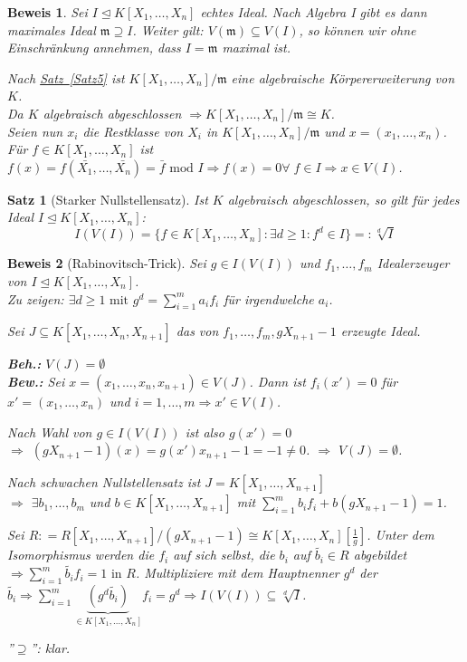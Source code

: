 \documentclass[a4paper,12pt]{scrbook}
\theoremstyle{break}
\theoremstyle{nonumberbreak}
\newtheorem{Bew}{Beweis}
\newtheorem{nnSatz}{Satz}
\theoremstyle{nonumberplain}
\newcommand{\defeqr}[0]{\mathrel{\mathop:}=}
\newcommand{\defeql}[0]{=\mathrel{\mathop:}}
\newcommand{\myref}[2]{%
\hyperref[#2]{#1~\ref*{#2}}%
}
\begin{document}
\begin{Bew}
  Sei $I \trianglelefteq K[X_1, \dots, X_n]$ echtes Ideal. Nach Algebra I gibt es dann maximales Ideal $\mathfrak{m} \supseteq I$. Weiter gilt: $V(\mathfrak{m}) \subseteq V(I)$, so können wir ohne Einschränkung annehmen, dass $I = \mathfrak{m}$ maximal ist.

  Nach \myref{Satz}{Satz5} ist $K[X_1, \dots, X_n]/\mathfrak{m}$ eine algebraische Körpererweiterung von $K$.\\
  Da $K$ algebraisch abgeschlossen $\Rightarrow K[X_1, \dots, X_n]/\mathfrak{m} \cong K$.\\
  Seien nun $x_i$ die Restklasse von $X_i$ in $K[X_1, \dots, X_n]/\mathfrak{m}$ und $x = (x_1, \dots, x_n)$.\\
  Für $f \in K[X_1, \dots, X_n]$ ist $f(x) = f(\bar{X_1}, \dots, \bar{X_n}) = \bar{f} \text{ mod } I \Rightarrow f(x) = 0 \forall \; f \in I \Rightarrow x \in V(I)$.
\end{Bew}

\begin{nnSatz}[Starker Nullstellensatz]
  Ist $K$ algebraisch abgeschlossen, so gilt für jedes Ideal $I \trianglelefteq K[X_1, \dots, X_n]$:
  $$I(V(I)) = \{ f \in K[X_1, \dots, X_n]: \exists d \ge 1: f^d \in I \} \defeql \sqrt[d]{I}$$
\end{nnSatz}

\begin{Bew}[Rabinovitsch-Trick]
  Sei $g \in I(V(I))$ und $f_1, \dots, f_m$ Idealerzeuger von $I \trianglelefteq K[X_1, \dots, X_n]$.\\
  Zu zeigen: $\exists d \geq 1 \text{ mit } g^d = \sum_{i = 1}^m a_i f_i$ für irgendwelche $a_i$.

  Sei $J \subseteq K[X_1, \dots, X_n, X_{n+1}]$ das von $f_1, \dots, f_m, gX_{n+1}-1$ erzeugte Ideal.

  \textbf{Beh.:} $V(J) = \emptyset$\\
  \textbf{Bew.:} Sei $x = (x_1, \dots, x_n, x_{n+1}) \in V(J)$.
  Dann ist $f_i(x') = 0$ für $x' = (x_1, \dots, x_n)$ und $i = 1, \dots, m \Rightarrow x' \in V(I)$.

  Nach Wahl von $g \in I(V(I))$ ist also $g(x') = 0$\\
  $\Rightarrow$ $(gX_{n+1}-1)(x) = g(x') x_{n+1} - 1 = -1 \not= 0$. $\Rightarrow$ $V(J) = \emptyset$.

  Nach schwachen Nullstellensatz ist $J = K[X_1, \dots, X_{n+1}]$\\
  $\Rightarrow$ $\exists b_1, \dots, b_m$ und $b \in K[X_1, \dots, X_{n+1}]$ mit $\sum_{i=1}^m b_i f_i + b(gX_{n+1} - 1) = 1$.

  Sei $R \defeqr R[X_1, \dots, X_{n+1}]/ (gX_{n+1} - 1) \cong K[X_1, \dots, X_n][\frac{1}{g}]$. Unter dem Isomorphismus werden die $f_i$ auf sich selbst, die $b_i$ auf $\tilde{b_i} \in R$ abgebildet $\Rightarrow \sum_{i = 1}^m \tilde{b_i} f_i = 1 \text{ in } R$.
  Multipliziere mit dem Hauptnenner $g^d$ der $\tilde{b_i} \Rightarrow \sum_{i = 1}^m \underset{\in K[X_1, \dots, X_n]}{\underbrace{(g^d \tilde{b_i})}} f_i = g^d \Rightarrow I(V(I)) \subseteq \sqrt[d]{I}$.

  ''$\supseteq$'': klar.
\end{Bew}
\end{document}
